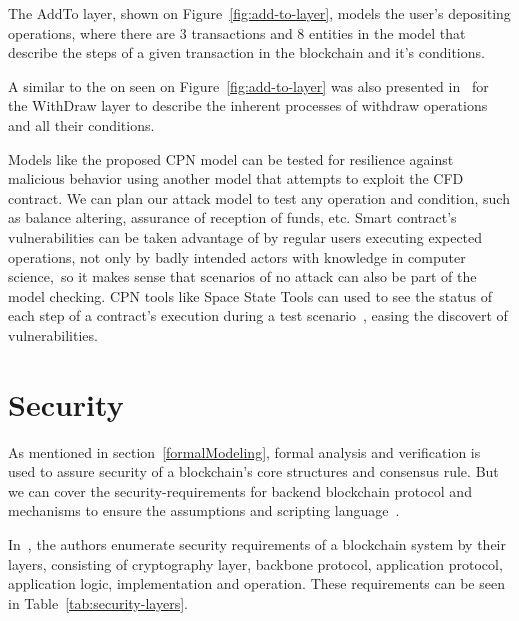 \documentclass[sigconf, nonacm]{acmart}
\begin{document}
The AddTo layer, shown on Figure~\ref{fig:add-to-layer}, models the user's depositing operations, where there are 
3 transactions and 8 entities in the model that describe the steps of a given transaction in the blockchain and it's conditions.

A similar to the on seen on Figure~\ref{fig:add-to-layer} was also presented in~\cite{Liu2019} for the WithDraw layer to describe the inherent processes
of withdraw operations and all their conditions.

Models like the proposed CPN model can be tested for resilience against malicious behavior using another model that attempts to exploit
the CFD contract. We can plan our attack model to test any operation and condition, such as balance altering, assurance of reception of funds,
etc. Smart contract's vulnerabilities can be taken advantage of by regular users executing expected operations, not only by badly intended actors 
with knowledge in computer science,~so it makes sense that scenarios of no attack can also be part of the model checking. 
CPN tools like Space State Tools can used to see the status of each step of a contract's execution during a test scenario~\cite{Liu2019},
easing the discovert of vulnerabilities.

\section{Security}\label{security}
As mentioned in section~\ref{formalModeling}, formal analysis and verification is used to assure security of a blockchain's core structures and consensus rule.
But we can cover the security-requirements for backend blockchain protocol and mechanisms to ensure the assumptions and scripting language~\cite{Matsuo2017}.

In~\cite{Matsuo2017}, the authors enumerate security requirements of a blockchain system by their layers, consisting of cryptography layer, backbone protocol, application protocol,
application logic, implementation and operation. These requirements can be seen in Table~\ref{tab:security-layers}.
\end{document}

